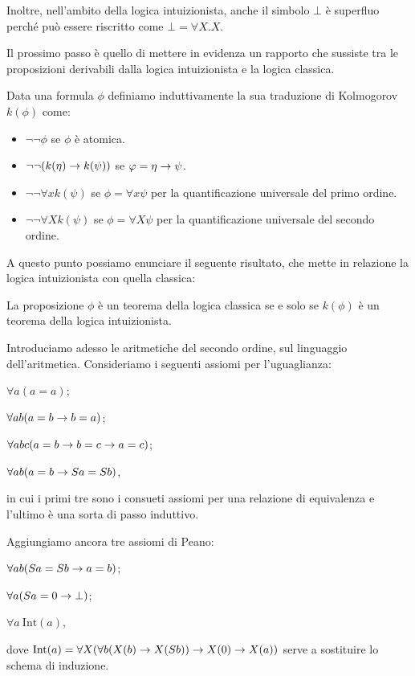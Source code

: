 \documentclass[]{marticle}
\begin{document}
Inoltre, nell'ambito della logica intuizionista, anche il simbolo $\bot$ \`e
superfluo perch\'e pu\`o essere riscritto come $\bot = \forall X.X$.

Il prossimo passo \`e quello di mettere in evidenza un rapporto che sussiste tra
le proposizioni derivabili dalla logica intuizionista e la logica classica.
\begin{block}[Definizione]
    Data una formula $\phi$ definiamo induttivamente la sua traduzione di
    Kolmogorov $k(\phi)$ come:
    \begin{itemize}
        \item $\lnot\lnot \phi$ se $\phi$ \`e atomica.
        \item $\lnot\lnot(k(\eta)\rightarrow k(\psi))$ se $\varphi=\eta\rightarrow\psi$.
        \item $\lnot\lnot \forall x k(\psi)$ se $\phi = \forall x \psi$ per la
            quantificazione universale del primo ordine.
        \item $\lnot\lnot \forall X k(\psi)$ se $\phi = \forall X \psi$ per la
            quantificazione universale del secondo ordine.
    \end{itemize}
\end{block}

A questo punto possiamo enunciare il seguente risultato, che mette in relazione
la logica intuizionista con quella classica:
\begin{block}[Proposizione]
    La proposizione $\phi$ \`e un teorema della logica classica se e solo se
    $k(\phi)$ \`e un teorema della logica intuizionista.
\end{block}

Introduciamo adesso le aritmetiche del secondo ordine, sul linguaggio
dell'aritmetica. 
Consideriamo i seguenti assiomi per l'uguaglianza:
\begin{nlist}[U1]
    \item $\forall a (a=a)$;
    \item $\forall ab (a=b\rightarrow b=a)$;
    \item $\forall abc (a=b \rightarrow b=c \rightarrow a=c)$;
    \item $\forall ab(a=b \rightarrow Sa = Sb)$,
\end{nlist}
in cui i primi tre sono i consueti assiomi per una relazione di equivalenza e
l'ultimo \`e una sorta di passo induttivo.

Aggiungiamo ancora tre assiomi di Peano:
\begin{nlist}[P1]
    \item $\forall ab(Sa =Sb \rightarrow a = b)$;
    \item $\forall a(Sa=0 \rightarrow \bot)$;
    \item $\forall a\ \text{Int}(a)$,
\end{nlist}
dove $\text{Int}(a) = \forall X(\forall b (X(b)\rightarrow X(Sb)) \rightarrow X(0) \rightarrow X(a))$
serve a sostituire lo schema di induzione.
\end{document}
